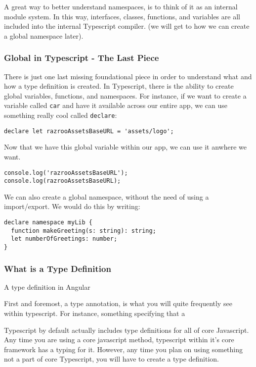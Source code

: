 A great way to better understand namespaces, is to think of it as an internal module system. In this way, interfaces, classes, functions, and variables are all included into the internal Typescript compiler. (we will get to how we can create a global namespace later).

\subsubsection{Global in Typescript - The Last Piece}
There is just one last missing foundational piece in order to understand what and how a type definition is created. In Typescript, there is the ability to 
create global variables, functions, and namespaces. For instance, if we want to create a variable called \lstinline{car} and have it available across our entire app, we can use something really cool called \lstinline{declare}: 

\begin{verbatim}
declare let razrooAssetsBaseURL = 'assets/logo';  
\end{verbatim}

Now that we have this global variable within our app, we can use it anwhere we want. 
\begin{lstlisting}[caption=useless.component.ts]
console.log('razrooAssetsBaseURL');
console.log(razrooAssetsBaseURL);
\end{lstlisting}

We can also create a global namespace, without the need of using a import/export. We would do this by writing: 
\begin{verbatim}
declare namespace myLib {
  function makeGreeting(s: string): string;
  let numberOfGreetings: number;
}  
\end{verbatim}

\subsubsection{What is a Type Definition}
A type definition in Angular 

First and foremost, a type annotation, is what you will quite frequently see within typescript. For instance, something specifying that a 


Typescript by default actually includes type definitions for all of core
Javascript. Any time you are using a core javascript method, typescript
within it's core framework has a typing for it. However, any time you
plan on using something not a part of core Typescript, you will have to
create a type definition. 

